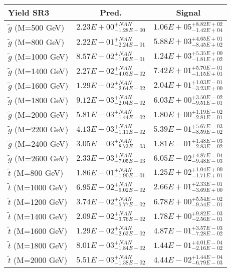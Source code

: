 \documentclass{article}
\begin{document}
 \begin{center}
 \begin{tabular}{ |l|c|c| } 
 \hline
 Yield SR3 & Pred. & Signal \\
 \hline
 \hline
 $\tilde{g}$ (M=500 GeV) & $2.23E+00^{+NAN}_{-1.28E+00}$ & $1.06E+05^{+8.82E+02}_{-1.42E+04}$ \\
 \hline
 $\tilde{g}$ (M=800 GeV) & $2.22E-01^{+NAN}_{-2.24E-01}$ & $5.88E+03^{+4.65E+01}_{-8.45E+02}$ \\
 \hline
 $\tilde{g}$ (M=1000 GeV) & $8.57E-02^{+NAN}_{-1.09E-01}$ & $1.24E+03^{+5.35E+00}_{-1.81E+02}$ \\
 \hline
 $\tilde{g}$ (M=1400 GeV) & $2.27E-02^{+NAN}_{-4.03E-02}$ & $7.42E+01^{+5.70E-01}_{-1.15E+01}$ \\
 \hline
 $\tilde{g}$ (M=1600 GeV) & $1.29E-02^{+NAN}_{-2.64E-02}$ & $2.04E+01^{+1.03E-01}_{-3.23E+00}$ \\
 \hline
 $\tilde{g}$ (M=1800 GeV) & $9.12E-03^{+NAN}_{-2.04E-02}$ & $6.03E+00^{+3.50E-02}_{-9.51E-01}$ \\
 \hline
 $\tilde{g}$ (M=2000 GeV) & $5.81E-03^{+NAN}_{-1.44E-02}$ & $1.80E+00^{+1.19E-02}_{-2.81E-01}$ \\
 \hline
 $\tilde{g}$ (M=2200 GeV) & $4.13E-03^{+NAN}_{-1.11E-02}$ & $5.39E-01^{+5.67E-03}_{-8.59E-02}$ \\
 \hline
 $\tilde{g}$ (M=2400 GeV) & $3.05E-03^{+NAN}_{-8.73E-03}$ & $1.81E-01^{+1.48E-03}_{-2.83E-02}$ \\
 \hline
 $\tilde{g}$ (M=2600 GeV) & $2.33E-03^{+NAN}_{-7.05E-03}$ & $6.05E-02^{+4.87E-04}_{-9.48E-03}$ \\
 \hline
 $\tilde{t}$ (M=800 GeV) & $1.86E-01^{+NAN}_{-1.90E-01}$ & $1.25E+02^{+1.04E+00}_{-1.71E+01}$ \\
 \hline
 $\tilde{t}$ (M=1000 GeV) & $6.95E-02^{+NAN}_{-9.02E-02}$ & $2.66E+01^{+2.33E-01}_{-3.69E+00}$ \\
 \hline
 $\tilde{t}$ (M=1200 GeV) & $3.74E-02^{+NAN}_{-5.77E-02}$ & $6.78E+00^{+5.54E-02}_{-9.54E-01}$ \\
 \hline
 $\tilde{t}$ (M=1400 GeV) & $2.09E-02^{+NAN}_{-3.76E-02}$ & $1.78E+00^{+9.82E-03}_{-2.56E-01}$ \\
 \hline
 $\tilde{t}$ (M=1600 GeV) & $1.29E-02^{+NAN}_{-2.63E-02}$ & $4.87E-01^{+3.57E-03}_{-7.28E-02}$ \\
 \hline
 $\tilde{t}$ (M=1800 GeV) & $8.01E-03^{+NAN}_{-1.84E-02}$ & $1.44E-01^{+4.01E-04}_{-2.16E-02}$ \\
 \hline
 $\tilde{t}$ (M=2000 GeV) & $5.51E-03^{+NAN}_{-1.38E-02}$ & $4.44E-02^{+1.44E-04}_{-6.79E-03}$ \\

\end{tabular}
\end{center}
\end{document}
